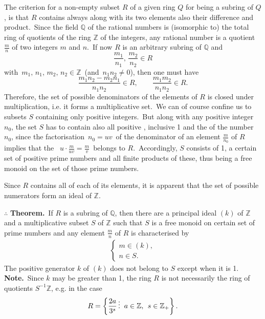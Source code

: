 \documentclass[12pt]{article}
\theoremstyle{definition}
\begin{document}
The criterion for a non-empty subset $R$ of a given ring $Q$ for being a subring of $Q$, is that $R$ contains always along with its two elements also their difference and product.\, Since the field $\mathbb{Q}$ of the rational numbers is (isomorphic to) the total ring of quotients of the ring $\mathbb{Z}$ of the integers, any rational number is a quotient $\displaystyle\frac{m}{n}$ of two integers $m$ and $n$.\, If now $R$ is an arbitrary subring of $\mathbb{Q}$ and 
$$\frac{m_1}{n_1},\, \frac{m_2}{n_2} \in R$$
with\, $m_1,\,n_1,\,m_2,\,n_2 \in \mathbb{Z}$\, (and\, $n_1n_2 \neq 0$), then one must have
$$\frac{m_1n_2-m_2n_1}{n_1n_2} \in R, \qquad \frac{m_1m_2}{n_1n_2} \in R.$$
Therefore, the set of possible denominators of the elements of $R$ is closed under multiplication, i.e. it forms a multiplicative set.\, We can of course confine us to subsets $S$ containing only positive integers.\, But along with any positive integer $n_0$, the set $S$ has to contain also all positive , inclusive 1 and the  of the number $n_0$, since the factorisation\, $n_0 = uv$\, of the denominator of an element $\displaystyle\frac{m}{n_0}$ of $R$ implies that the \, $\displaystyle u\cdot\frac{m}{uv} = \frac{m}{v}$\, belongs to $R$.\, Accordingly, $S$ consists of 1, a certain set of positive prime numbers and all finite products of these, thus being a free monoid on the set of those prime numbers.

Since $R$ contains all  of each of its elements, it is apparent that the set of possible numerators form an ideal of $\mathbb{Z}$.

$\therefore$\; \textbf{Theorem.}\, If $R$ is a subring of $\mathbb{Q}$, then there are a principal ideal $(k)$ of $\mathbb{Z}$ and a multiplicative subset $S$ of $\mathbb{Z}$ such that $S$ is a free monoid on certain set of prime numbers and any element $\displaystyle\frac{m}{n}$ of $R$ is characterised by 
\begin{align*}
\begin{cases}
m \in (k),\\
n \in S.
\end{cases}
\end{align*}
The positive generator $k$ of $(k)$ does not belong to $S$ except when it is 1.\\

\textbf{Note.}\, Since $k$ may be greater than 1, the ring $R$ is not necessarily the ring of quotients $S^{-1}\mathbb{Z}$, e.g. in the case
$$R = \left\{\frac{2a}{3^s}\,\vdots\;\; a \in \mathbb{Z},\;\, s \in \mathbb{Z}_+\right\}.\\$$
\end{document}
